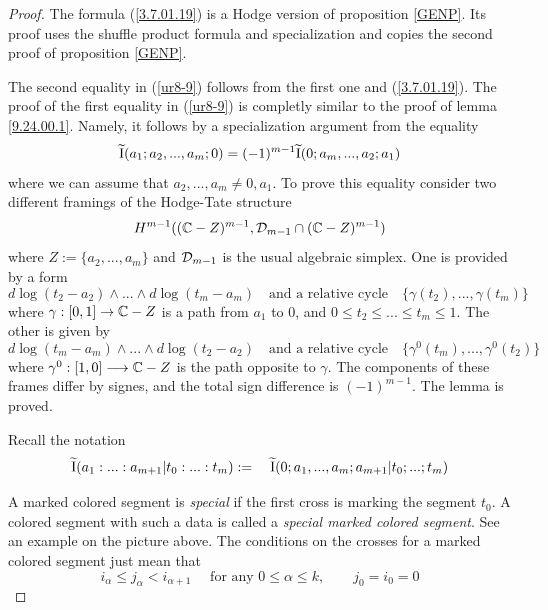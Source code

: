 \documentclass[10pt]{article}
\begin{document}
\begin{proof} The formula (\ref{3.7.01.19}) is a Hodge version of proposition \ref{GENP}. 
Its proof uses 
the shuffle product formula and specialization and copies 
 the second proof of proposition \ref{GENP}.  

 The second  equality in (\ref{ur8-9})
 follows from the first one and (\ref{3.7.01.19}). The proof of the first 
equality in (\ref{ur8-9}) is completly similar 
to the proof of lemma 
\ref{9.24.00.1}. Namely, it follows by a specialization argument from the equality 
$$
\widetilde {\rm I}(a_1; a_2, ..., a_m; 0) = (-1)^{m-1} 
\widetilde {\rm I}(0; a_m, ..., a_2; a_1)
$$
where we can assume that $a_2, ..., a_m \not = 0, a_1$. To prove this equality 
consider two different framings of  the Hodge-Tate structure 
$$
H^{m-1}(({\mathbb C} - Z)^{m-1}, {\cal D}_{m-1} \cap ({\mathbb C} - Z)^{m-1})
$$
where $Z := \{a_2, ..., a_m\}$ and ${\cal D}_{m-1}$ is the usual algebraic simplex. 
One  is provided by a form $$
d \log(t_2 -a_2) \wedge ... \wedge  d \log(t_m -a_m)\quad \mbox{and a relative cycle} \quad \{\gamma(t_2), ..., \gamma(t_m)\}
$$
where  $\gamma: [0, 1] \to {\mathbb C} - Z$ is a path from $a_1$ to $0$, and 
$0 \leq t_2 \leq ... \leq t_m\leq 1 $. 
The other is given 
by 
$$
d \log(t_m -a_m) \wedge ... \wedge  d \log(t_2 -a_2)
\quad \mbox{and a relative cycle} \quad
\{\gamma^0(t_m), ..., \gamma^0(t_2)\}
$$ where 
$\gamma^0: [1,0] \longrightarrow {\mathbb C} -Z$ is the path  opposite to $\gamma$. The components of these frames differ by signes, and the total sign difference is $(-1)^{m-1}$. 
The lemma is proved. 

Recall the notation
$$
\widetilde {\rm I}(a_1: ... : a_{m+1}| t_0: ... :t_{m}):= \quad 
\widetilde {\rm I}(0; a_1, ... , a_m; a_{m+1}| t_0; ... ;t_{m})
$$


A marked colored segment is {\it special} if the first cross is marking 
the segment $t_0$. 
A colored segment with such a  data is called a {\it special marked colored segment}. 
See an example on the picture above. 
The conditions on the crosses for a marked colored segment just mean that 
\begin{equation}  \label{ur10*}
i_{\alpha } \leq j_{\alpha } < i_{\alpha +1} \quad \mbox{ for any 
$0\leq \alpha \leq k$}, \qquad j_0 = i_0 = 0
\end{equation}


\end{proof}
\end{document}
